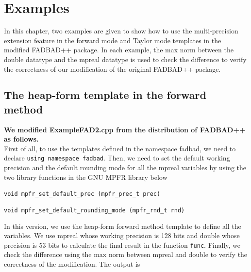 
\chapter{Examples}\label{ch:examples}
In this chapter, two examples are given to show how to use the multi-precision extension feature in the forward mode and Taylor mode templates in the modified FADBAD++ package. In each example, the max norm between the double datatype and the mpreal datatype is used to check the difference to verify the correctness of our modification of the original FADBAD++ package. 
\newpage
\section{The heap-form template in the forward method}
{\textbf{We modified ExampleFAD2.cpp from the distribution of FADBAD++ as follows.}}\\

\newpage
First of all, to use the templates defined in the namespace fadbad, we need to declare \texttt{using namespace fadbad}. Then, we need to set the default working precision and the default rounding mode for all the mpreal variables by using the two library functions in the GNU MPFR library below

\texttt{void mpfr\_set\_default\_prec (mpfr\_prec\_t prec)}

\texttt{void mpfr\_set\_default\_rounding\_mode (mpfr\_rnd\_t rnd)}

In this version, we use the heap-form forward method template to define all the variables. We use mpreal whose working precision is 128 bits and double whose precision is 53 bits to calculate the final result in the function \texttt{func}. Finally, we check the difference using the max norm between mpreal and double to verify the correctness of the modification. The output is

\newpage
